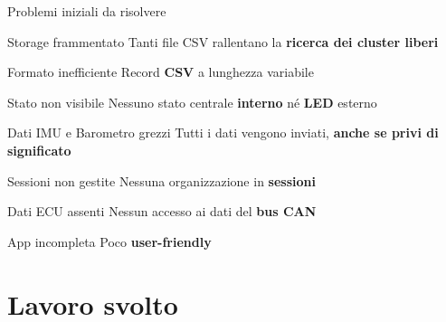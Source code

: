 \documentclass[aspectratio=169]{beamer}
\begin{document}
\begin{frame}{Problemi iniziali da risolvere}
  \begin{center}
  \begin{tcbraster}[raster columns=3,raster equal height,raster column skip=8pt,raster row skip=8pt]
    \begin{cardred}{Storage frammentato}
      Tanti file CSV rallentano la \textbf{ricerca dei cluster liberi}
    \end{cardred}
    \begin{cardred}{Formato inefficiente}
      Record \textbf{CSV} a lunghezza variabile
    \end{cardred}
    \begin{cardred}{Stato non visibile}
      Nessuno stato centrale \textbf{interno} né \textbf{LED} esterno
    \end{cardred}
    \begin{cardred}{Dati IMU e Barometro grezzi}
      Tutti i dati vengono inviati, \textbf{anche se privi di significato}
    \end{cardred}
    \begin{cardred}{Sessioni non gestite}
      Nessuna organizzazione in \textbf{sessioni}
    \end{cardred}
    \begin{cardgold}{Dati ECU assenti}
      Nessun accesso ai dati del \textbf{bus CAN}
    \end{cardgold}
    \begin{cardpetrol}{App incompleta}
      Poco \textbf{user-friendly}
    \end{cardpetrol}
  \end{tcbraster}
  \end{center}
\end{frame}

\section{Lavoro svolto}
\end{document}
